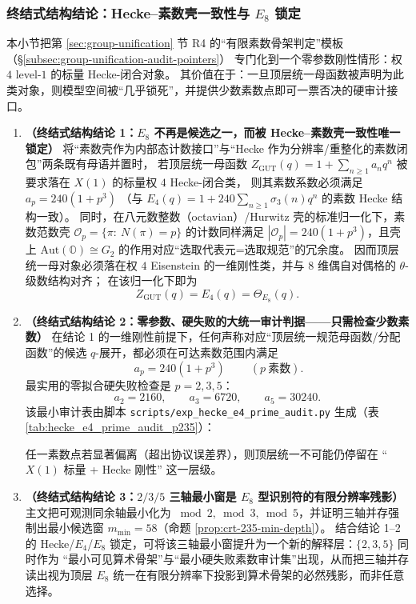 \subsubsection{终结式结构结论：Hecke--素数壳一致性与 \texorpdfstring{$E_8$}{E8} 锁定}\label{subsubsec:bridgepack-e8-hecke-lock}
本小节把第 \ref{sec:group-unification} 节 R4 的“有限素数骨架判定”模板（\S\ref{subsec:group-unification-audit-pointers}）
专门化到一个零参数刚性情形：权 \(4\) level-\(1\) 的标量 Hecke-闭合对象。
其价值在于：一旦顶层统一母函数被声明为此类对象，则模型空间被“几乎锁死”，并提供少数素数点即可一票否决的硬审计接口。
\begin{enumerate}
  \item \textbf{（终结式结构结论 1：\texorpdfstring{$E_8$}{E8} 不再是候选之一，而被 Hecke--素数壳一致性唯一锁定）}
  将“素数壳作为内部态计数接口”与“Hecke 作为分辨率/重整化的素数闭包”两条既有母语并置时，
  若顶层统一母函数 \(Z_{\mathrm{GUT}}(q)=1+\sum_{n\ge 1}a_n q^n\) 被要求落在 \(X(1)\) 的标量权 \(4\) Hecke-闭合类，
  则其素数系数必须满足
  \(
  a_p=240(1+p^3)
  \)
  （与 \(E_4(q)=1+240\sum_{n\ge 1}\sigma_3(n)q^n\) 的素数 Hecke 结构一致）。
  同时，在八元数整数（octavian）/Hurwitz 壳的标准归一化下，素数范数壳
  \(\mathcal{O}_p=\{\pi:\ N(\pi)=p\}\)
  的计数同样满足 \(|\mathcal{O}_p|=240(1+p^3)\)，且壳上 \(\mathrm{Aut}(\mathbb{O})\cong G_2\) 的作用对应“选取代表元=选取规范”的冗余度。
  因而顶层统一母对象必须落在权 \(4\) Eisenstein 的一维刚性类，并与 \(8\) 维偶自对偶格的 \(\theta\)-级数结构对齐；
  在该归一化下即为
  \[
  Z_{\mathrm{GUT}}(q)=E_4(q)=\Theta_{E_8}(q).
  \]

  \item \textbf{（终结式结构结论 2：零参数、硬失败的大统一审计判据——只需检查少数素数）}
  在结论 1 的一维刚性前提下，任何声称对应“顶层统一规范母函数/分配函数”的候选 \(q\)-展开，都必须在可达素数范围内满足
  \[
  \boxed{\ a_p=240(1+p^3)\ }\qquad(p\ \text{素数}).
  \]
  最实用的零拟合硬失败检查是 \(p=2,3,5\)：
  \[
  a_2=2160,\qquad a_3=6720,\qquad a_5=30240.
  \]
  该最小审计表由脚本 \texttt{scripts/exp\_hecke\_e4\_prime\_audit.py} 生成（表 \ref{tab:hecke_e4_prime_audit_p235}）：
  
  任一素数点若显著偏离（超出协议误差界），则顶层统一不可能仍停留在 “\(X(1)\) 标量 + Hecke 刚性” 这一层级。

  \item \textbf{（终结式结构结论 3：\texorpdfstring{$2/3/5$}{2/3/5} 三轴最小窗是 \texorpdfstring{$E_8$}{E8} 型识别符的有限分辨率残影）}
  主文把可观测同余轴最小化为 \(\bmod 2,\bmod 3,\bmod 5\)，并证明三轴并存强制出最小候选窗 \(m_{\min}=58\)（命题 \ref{prop:crt-235-min-depth}）。
  结合结论 1--2 的 Hecke/\(E_4\)/\(E_8\) 锁定，可将该三轴最小窗提升为一个新的解释层：\(\{2,3,5\}\) 同时作为
  “最小可见算术骨架”与“最小硬失败素数审计集”出现，从而把三轴并存读出视为顶层 \(E_8\) 统一在有限分辨率下投影到算术骨架的必然残影，而非任意选择。


\end{enumerate}
